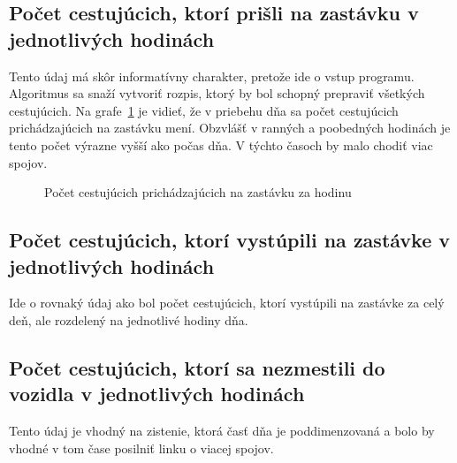 \subsection*{Počet cestujúcich, ktorí prišli na zastávku v jednotlivých hodinách}
Tento údaj má skôr informatívny charakter, pretože ide o vstup programu.
Algoritmus sa snaží vytvoriť rozpis, ktorý by bol schopný prepraviť všetkých cestujúcich.
Na grafe~\ref{fig:passengersArrivedPerHour} je vidieť, že v priebehu dňa sa počet cestujúcich prichádzajúcich na zastávku mení.
Obzvlášť v ranných a poobedných hodinách je tento počet výrazne vyšší ako počas dňa.
V týchto časoch by malo chodiť viac spojov.
\begin{figure}[h]\label{fig:passengersArrivedPerHour}
  \centering
  \caption{Počet cestujúcich prichádzajúcich na zastávku za hodinu}
\end{figure}

\subsection*{Počet cestujúcich, ktorí vystúpili na zastávke v jednotlivých hodinách}
Ide o rovnaký údaj ako bol počet cestujúcich, ktorí vystúpili na zastávke za celý deň, ale rozdelený na jednotlivé hodiny dňa.

\subsection*{Počet cestujúcich, ktorí sa nezmestili do vozidla v jednotlivých hodinách}
Tento údaj je vhodný na zistenie, ktorá časť dňa je poddimenzovaná a bolo by vhodné v tom čase posilniť linku o viacej spojov.

